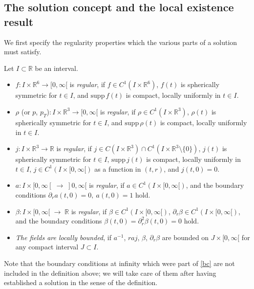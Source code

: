 \documentclass[11pt]{article}
\def\R{\mathbb R}
\def\supp{\mathrm{supp}\,}
\begin{document}
\subsection{The solution concept and the local existence result}
%
%
We first specify the regularity properties which the various parts of a
solution must satisfy.
%
\begin{definition}\label{regular}
  Let $I\subset \R$ be an interval.
  \begin{itemize}
    \item[(a)]
      $f\colon I\times \R^6 \rightarrow [0,\infty[$ is {\em regular}, if
      $f\in C^1(I\times \R^6)$, $f(t)$ is spherically symmetric for
      $t\in I$, and $\supp f(t)$ is compact, locally uniformly in $t \in I$. 	
    \item[(b)]
      $\rho $ (or $p$, $p_T$)$\colon  I \times \R^3 \rightarrow [0,\infty[$
      is {\em regular}, if
      $\rho \in C^1 (I\times \R^3)$, $\rho(t)$
      is spherically symmetric for $t\in I$,
      and $\supp \rho(t)$ is compact, locally uniformly in $t\in I$. 		
    \item[(c)]
      $j\colon I\times \R^3 \rightarrow \R$ is {\em regular}, if
      $ j \in C(I\times \R^3) \cap C^1 (I\times \R^3 \setminus \{0\} )$,
      $j(t)$ is spherically symmetric for $t \in I$, $ \supp j(t)$ is compact,
      locally uniformly in $t \in I$, $j \in C^1(I\times[0,\infty[)$
      as a function in $(t,r)$, and $j(t,0)=0$. 
    \item[(d)]
      $a\colon I\times [0,\infty[ \; \rightarrow \; ]0,\infty[$
      is {\em regular},
      if $a \in C^1(I\times [0,\infty[)$,
      and the boundary conditions $\partial_r a(t,0)=0,\ a(t,0)=1$ hold.
    \item[(e)]
      $\beta \colon I\times [0,\infty[ \; \rightarrow \; \R$
      is {\em regular}, if
      $\beta  \in C^1(I \times [0,\infty[)$,
      $\partial_r \beta  \in C^1(I \times [0,\infty[)$,
      and the boundary conditions
      $\beta(t,0) = \partial_r^2 \beta(t,0) =0$ hold.
    \item[(f)]
      {\em The fields are locally bounded}, if
      $a^{-1}$, $r a j$, $\beta$,
      $\partial_r\beta$ 
      are bounded on $J \times [0,\infty[$ for any compact interval
      $J\subset I$.
  \end{itemize}
\end{definition}
%
Note that the boundary conditions at infinity which were part of \eqref{bc}
are not included in the definition above; we will take care of them after
having established a solution in the sense of the definition.
\end{document}
